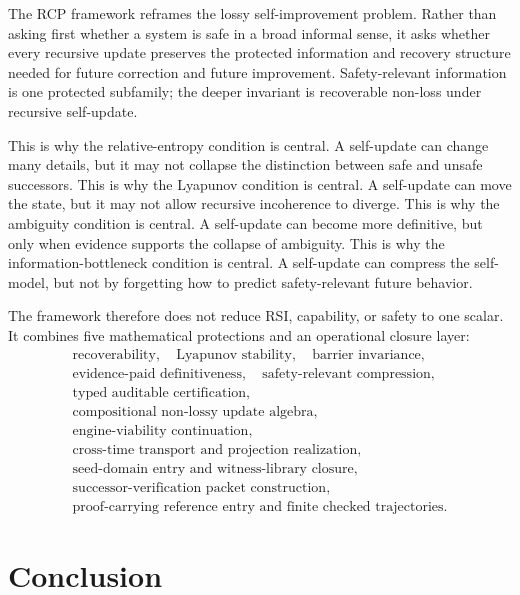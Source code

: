 \documentclass[11pt]{article}
\newcommand{\1}{\mathbf{1}}
\begin{document}
The RCP framework reframes the lossy self-improvement problem. Rather than asking first whether a system is safe in a broad informal sense, it asks whether every recursive update preserves the protected information and recovery structure needed for future correction and future improvement. Safety-relevant information is one protected subfamily; the deeper invariant is recoverable non-loss under recursive self-update.

This is why the relative-entropy condition is central. A self-update can change many details, but it may not collapse the distinction between safe and unsafe successors. This is why the Lyapunov condition is central. A self-update can move the state, but it may not allow recursive incoherence to diverge. This is why the ambiguity condition is central. A self-update can become more definitive, but only when evidence supports the collapse of ambiguity. This is why the information-bottleneck condition is central. A self-update can compress the self-model, but not by forgetting how to predict safety-relevant future behavior.

The framework therefore does not reduce RSI, capability, or safety to one scalar. It combines five mathematical protections and an operational closure layer:
\[
\begin{gathered}
\text{recoverability},\quad
\text{Lyapunov stability},\quad
\text{barrier invariance},\\
\text{evidence-paid definitiveness},\quad
\text{safety-relevant compression},\\
\text{typed auditable certification},\\
\text{compositional non-lossy update algebra},\\
\text{engine-viability continuation},\\
\text{cross-time transport and projection realization},\\
\text{seed-domain entry and witness-library closure},\\
\text{successor-verification packet construction},\\
\text{proof-carrying reference entry and finite checked trajectories}.
\end{gathered}
\]

\section{Conclusion}
\end{document}
